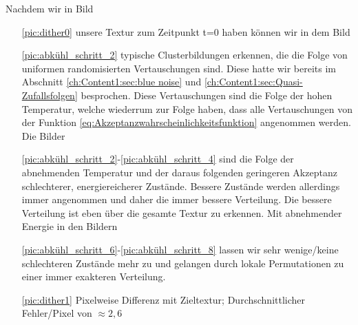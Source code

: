   Nachdem wir in Bild 
  \begin{itemize}
    \item[\ref{pic:dither0}] unsere  Textur zum Zeitpunkt t=0 
                              haben können wir in dem Bild
    \item[\ref{pic:abkühl_schritt_2}] typische Clusterbildungen erkennen, die die Folge von 
                                    uniformen randomisierten Vertauschungen sind. Diese hatte wir bereits 
                                    im Abschnitt \ref{ch:Content1:sec:blue noise} und \ref{ch:Content1:sec:Quasi-Zufallsfolgen}
                                    besprochen. Diese Vertauschungen sind die Folge der hohen Temperatur, welche wiederrum zur Folge haben, 
                                    dass alle Vertauschungen von der Funktion \ref{eq:Akzeptanzwahrscheinlichkeitsfunktion} angenommen werden. 
                                    Die Bilder  
    \item[\ref{pic:abkühl_schritt_2}-\ref{pic:abkühl_schritt_4}] sind die Folge der abnehmenden Temperatur und der daraus folgenden geringeren 
                                    Akzeptanz schlechterer, energiereicherer Zustände. Bessere Zustände werden allerdings immer angenommen und 
                                    daher die immer bessere  Verteilung. Die bessere Verteilung ist eben über 
                                    die gesamte Textur zu erkennen. Mit abnehmender Energie in den Bildern   
    \item[\ref{pic:abkühl_schritt_6}-\ref{pic:abkühl_schritt_8}] lassen wir sehr wenige/keine schlechteren Zustände mehr zu und gelangen durch 
                                    lokale Permutationen zu einer immer exakteren Verteilung.  
    \item[\ref{pic:dither1}] Pixelweise Differenz mit Zieltextur; Durchschnittlicher Fehler/Pixel von $\approx 2,6$ 
  \end{itemize}





